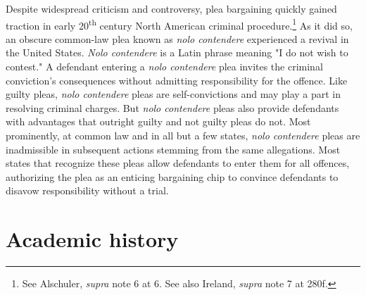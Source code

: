 Despite widespread criticism and controversy, plea bargaining quickly gained traction in early 20\textsuperscript{th} century North American criminal procedure.\footnote{See Alschuler, \textit{supra} note 6 at 6. See also Ireland, \textit{supra} note 7 at 280f.} As it did so, an obscure common-law plea known as \textit{nolo contendere} experienced a revival in the United States. \textit{Nolo contendere} is a Latin phrase meaning "I do not wish to contest." A defendant entering a \textit{nolo contendere} plea invites the criminal conviction's consequences without admitting responsibility for the offence. Like guilty pleas, \textit{nolo contendere} pleas are self-convictions and may play a part in resolving criminal charges. But \textit{nolo contendere} pleas also provide defendants with advantages that outright guilty and not guilty pleas do not. Most prominently, at common law and in all but a few states, \textit{nolo contendere} pleas are inadmissible in subsequent actions stemming from the same allegations. Most states that recognize these pleas allow defendants to enter them for all offences, authorizing the plea as an enticing bargaining chip to convince defendants to disavow responsibility without a trial.

\section{Academic history}


